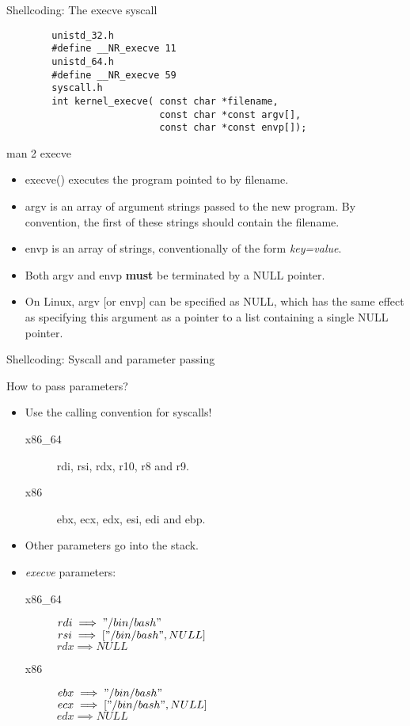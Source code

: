 \begin{frame}{Shellcoding: The execve syscall}
	\ccode
	\begin{lstlisting}
		unistd_32.h
		#define __NR_execve 11
		unistd_64.h
		#define __NR_execve 59
		syscall.h
		int kernel_execve( const char *filename,
		                   const char *const argv[],
		                   const char *const envp[]);
	\end{lstlisting}
	\begin{block}{man 2 execve}
		\begin{itemize}
			\item execve() executes  the  program  pointed to by filename.
			\item argv is an array of argument strings passed to the new program. By
				convention, the first of these  strings  should contain the filename.
			\item envp is an array of strings, conventionally of the form \emph{key=value}.
			\item Both argv and envp \textbf{must} be terminated by a NULL pointer.
			\item On Linux, argv [or envp] can be specified as NULL, which has the same effect as specifying  this  argument as a pointer to a list containing a single NULL pointer.
		\end{itemize}
	\end{block}
\end{frame}

\begin{frame}{Shellcoding: Syscall and parameter passing}
	\begin{block}{How to pass parameters?}
		\begin{itemize}
			\item Use the calling convention for syscalls!
				\begin{description}
					\item[x86\_64]rdi, rsi, rdx, r10, r8 and r9.
					\item[x86]ebx, ecx, edx, esi, edi and ebp.
				\end{description}
			\item Other parameters go into the stack.
			\item \emph{execve} parameters:
				\begin{description}
					\item[x86\_64] $rdi\implies "/bin/bash"$\\
						$rsi\implies ["/bin/bash", NULL]$\\
						$rdx\implies NULL$\\
					\item[x86]$ebx \implies "/bin/bash"$\\
						$ecx \implies ["/bin/bash", NULL]$\\
						$edx \implies NULL$
				\end{description}
		\end{itemize}
	\end{block}
\end{frame}

